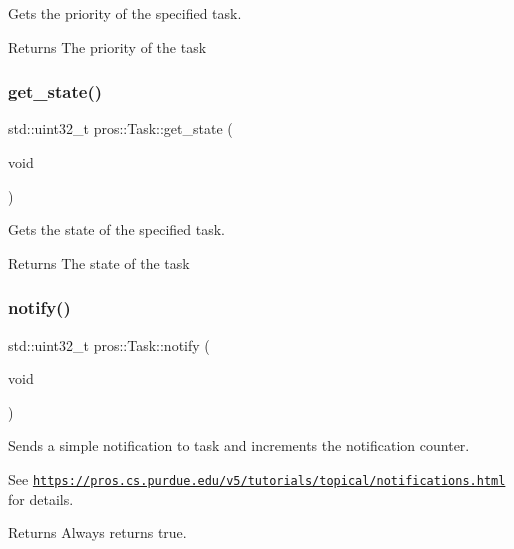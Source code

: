 Gets the priority of the specified task.

\begin{DoxyReturn}{Returns}
The priority of the task 
\end{DoxyReturn}
\mbox{\label{classpros_1_1Task_a45f0b63eec57e7fe8adf3876988588bf}} 
\subsubsection{\texorpdfstring{get\+\_\+state()}{get\_state()}}
{\footnotesize\ttfamily std\+::uint32\+\_\+t pros\+::\+Task\+::get\+\_\+state (\begin{DoxyParamCaption}\item[{void}]{ }\end{DoxyParamCaption})}

Gets the state of the specified task.

\begin{DoxyReturn}{Returns}
The state of the task 
\end{DoxyReturn}
\mbox{\label{classpros_1_1Task_ad376e3065701ba4853d4be1c90c0544c}} 
\subsubsection{\texorpdfstring{notify()}{notify()}}
{\footnotesize\ttfamily std\+::uint32\+\_\+t pros\+::\+Task\+::notify (\begin{DoxyParamCaption}\item[{void}]{ }\end{DoxyParamCaption})}

Sends a simple notification to task and increments the notification counter.

See \href{https://pros.cs.purdue.edu/v5/tutorials/topical/notifications.html}{\tt https\+://pros.\+cs.\+purdue.\+edu/v5/tutorials/topical/notifications.\+html} for details.

\begin{DoxyReturn}{Returns}
Always returns true. 
\end{DoxyReturn}
\mbox{\label{classpros_1_1Task_a6fc6c97f2dd9fc92b6b9ff47557f215f}} 
